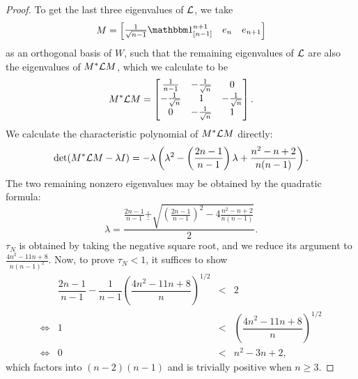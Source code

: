 \begin{proof}
To get the last three eigenvalues of $\mathcal{L}$, we take \[M = \begin{bmatrix} \frac{1}{\sqrt{n - 1}} \one_{[n - 1]}^{n + 1} & e_n & e_{n + 1}\end{bmatrix}\] as an orthogonal basis of $W$, such that the remaining eigenvalues of $\mathcal{L}$ are also the eigenvalues of $M^* \mathcal{L} M$, which we calculate to be \[M^* \mathcal{L} M = \begin{bmatrix} \frac{1}{n - 1} & -\frac{1}{\sqrt{n}} & 0 \\ -\frac{1}{\sqrt{n}} & 1 & -\frac{1}{\sqrt{n}} \\ 0 & -\frac{1}{\sqrt{n}} & 1 \end{bmatrix}.\]  We calculate the characteristic polynomial of $M^* \mathcal{L} M$ directly: \[\det(M^* \mathcal{L} M - \lambda I) = -\lambda\left(\lambda^2 - \left(\frac{2n - 1}{n - 1}\right) \lambda + \frac{n^2 - n + 2}{n(n - 1)}\right).\]  The two remaining nonzero eigenvalues may be obtained by the quadratic formula: \[\lambda = \dfrac{\displaystyle \frac{2n - 1}{n - 1} \underline{+} \sqrt{\left(\frac{2n - 1}{n - 1}\right)^2 - 4 \frac{n^2 - n + 2}{n (n - 1)}}}{2}.\]  $\tau_N$ is obtained by taking the negative square root, and we reduce its argument to $\frac{4 n^2 - 11 n + 8}{n (n - 1)^2}$.  Now, to prove $\tau_N < 1$, it suffices to show
\[\begin{array}{crcl}
  & \dfrac{2n - 1}{n - 1} - \dfrac{1}{n - 1}\left(\dfrac{4 n^2 - 11 n + 8}{n}\right)^{1 / 2} & < & 2 \\
  \iff & 1 & < & \left(\dfrac{4 n^2 - 11 n + 8}{n}\right)^{1 / 2} \\
  \iff & 0 & < & n^2 - 3n + 2,
\end{array}\]
which factors into $(n - 2) (n - 1)$ and is trivially positive when $n \ge 3$.
\end{proof}
